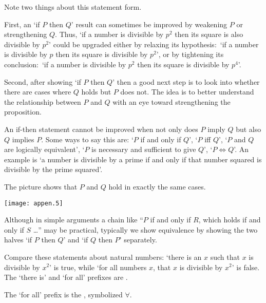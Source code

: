 Note two things about this statement form.

First, an `if \( P \) then \( Q \)' result can sometimes be improved
by weakening \( P \) or strengthening \( Q \).
Thus, `if a number is divisible by \( p^2 \) then its square is also
divisible by \( p^2 \)' could be upgraded either by relaxing its
hypothesis:~`if a number is divisible by \( p \) then its square
is divisible by \( p^2 \)', or by tightening its conclusion:~`if
a number is divisible by \( p^2 \) then its square is divisible by
\( p^4 \)'.

Second,
after showing `if \( P \) then \( Q \)' then a good next step is to look into
whether there are cases where \( Q \) holds but \( P \) does not.
The idea is to better understand the relationship between \( P \) and
\( Q \) with an eye toward strengthening the proposition.



An if-then statement
cannot be improved when not only does \( P \) imply \( Q \) but
also \( Q \) implies \( P \). 
Some ways to say this are:
`\( P \) if and only if
\( Q \)', `\( P \) iff \( Q \)', `\( P \) and \( Q \) are logically
equivalent', `\( P \) is necessary and sufficient to give \( Q \)',
`\( P\iff Q \)'.
An example is `a number is divisible by a prime if and only if that number
squared is divisible by the prime squared'.

The picture shows that \( P \) and \( Q \) hold in exactly the
same cases.
\begin{center}
  \texttt{[image: appen.5]}
\end{center}
Although in simple arguments a chain like 
``\( P \) if and only if $R$, which holds if and only if $S$ \ldots''
may be practical, typically we show equivalence by showing the two halves
`if \( P \) then \( Q \)' and `if \( Q \) then \( P \)' separately.








%
Compare these statements about natural numbers:
`there is an \( x \) such that \( x \) is
divisible by \( x^2 \)' is true, while
`for all numbers \( x \), that \( x \) is divisible by \( x^2 \)' is false.
The `there is' and `for all' 
prefixes are .

The `for all' prefix is the 
, 
symbolized \( \forall \).

